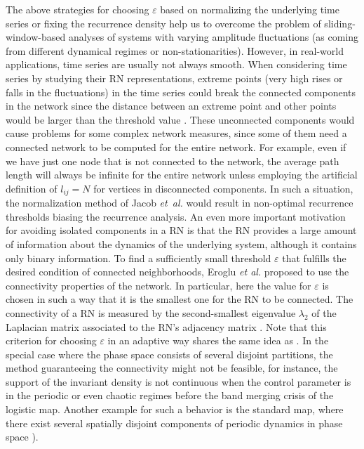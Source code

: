 		The above strategies for choosing $\varepsilon$ based on normalizing the underlying time series or fixing the recurrence density help us to overcome the problem of sliding-window-based analyses of systems with varying amplitude fluctuations (as coming from different dynamical regimes or non-stationarities). However, in real-world applications, time series are usually not always smooth. When considering time series by studying their RN representations, extreme points (very high rises or falls in the fluctuations) in the time series could break the connected components in the network since the distance between an extreme point and other points would be larger than the threshold value \cite{Eroglu2014}. These unconnected components would cause problems for some complex network measures, since some of them need a connected network to be computed for the entire network. For example, even if we have just one node that is not connected to the network, the average path length will always be infinite for the entire network unless employing the artificial definition of $l_{ij}=N$ for vertices in disconnected components. In such a situation, the normalization method of Jacob \emph{et~al.} \cite{Jacob2016b,Jacob2016a} would result in non-optimal recurrence thresholds biasing the recurrence analysis. An even more important motivation for avoiding isolated components in a RN is that the RN provides a large amount of information about the dynamics of the underlying system, although it contains only binary information. To find a sufficiently small threshold $\varepsilon$ that fulfills the desired condition of connected neighborhoods, Eroglu {\textit{et al.}} proposed to use the connectivity properties of the network. In particular, here the value for $\varepsilon$ is chosen in such a way that it is the smallest one for the RN to be connected. The connectivity of a RN is measured by the second-smallest eigenvalue $\lambda_2$ of the Laplacian matrix associated to the RN's adjacency matrix \cite{Eroglu2014}. Note that this criterion for choosing $\varepsilon$ in an adaptive way shares the same idea as \cite{Jacob2016b,Lin2016}. In the special case where the phase space consists of several disjoint partitions, the method guaranteeing the connectivity might not be feasible, for instance, the support of the invariant density is not continuous when the control parameter is in the periodic or even chaotic regimes before the band merging crisis of the logistic map. Another example for such a behavior is the standard map, where there exist several spatially disjoint components of periodic dynamics in phase space \cite{Donner2010b,Zou2016d}).

